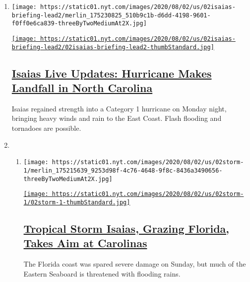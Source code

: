 \begin{enumerate}
\def\labelenumi{\arabic{enumi}.}
\item
  \texttt{[image: https://static01.nyt.com/images/2020/08/02/us/02isaias-briefing-lead2/merlin\_175230825\_510b9c1b-d6dd-4198-9601-f0ff0e6ca839-threeByTwoMediumAt2X.jpg]}

  \href{/2020/08/03/us/isaias-storm-updates.html}{\texttt{[image: https://static01.nyt.com/images/2020/08/02/us/02isaias-briefing-lead2/02isaias-briefing-lead2-thumbStandard.jpg]}}

  \hypertarget{isaias-live-updates-hurricane-makes-landfall-in-north-carolina}{%
  \subsection{\texorpdfstring{\href{/2020/08/03/us/isaias-storm-updates.html}{Isaias
  Live Updates: Hurricane Makes Landfall in North
  Carolina}}{Isaias Live Updates: Hurricane Makes Landfall in North Carolina}}\label{isaias-live-updates-hurricane-makes-landfall-in-north-carolina}}

  Isaias regained strength into a Category 1 hurricane on Monday night,
  bringing heavy winds and rain to the East Coast. Flash flooding and
  tornadoes are possible.
\item
  \begin{enumerate}
  \def\labelenumii{\arabic{enumii}.}
  \item
    \texttt{[image: https://static01.nyt.com/images/2020/08/02/us/02storm-1/merlin\_175215639\_9253d98f-4c76-4648-9f8c-8436a3490656-threeByTwoMediumAt2X.jpg]}

    \href{/2020/08/02/us/tropical-storm-isaias-florida-carolina.html}{\texttt{[image: https://static01.nyt.com/images/2020/08/02/us/02storm-1/02storm-1-thumbStandard.jpg]}}

    \hypertarget{tropical-storm-isaias-grazing-florida-takes-aim-at-carolinas}{%
    \subsection{\texorpdfstring{\href{/2020/08/02/us/tropical-storm-isaias-florida-carolina.html}{Tropical
    Storm Isaias, Grazing Florida, Takes Aim at
    Carolinas}}{Tropical Storm Isaias, Grazing Florida, Takes Aim at Carolinas}}\label{tropical-storm-isaias-grazing-florida-takes-aim-at-carolinas}}

    The Florida coast was spared severe damage on Sunday, but much of
    the Eastern Seaboard is threatened with flooding rains.


\end{enumerate}
\end{enumerate}

